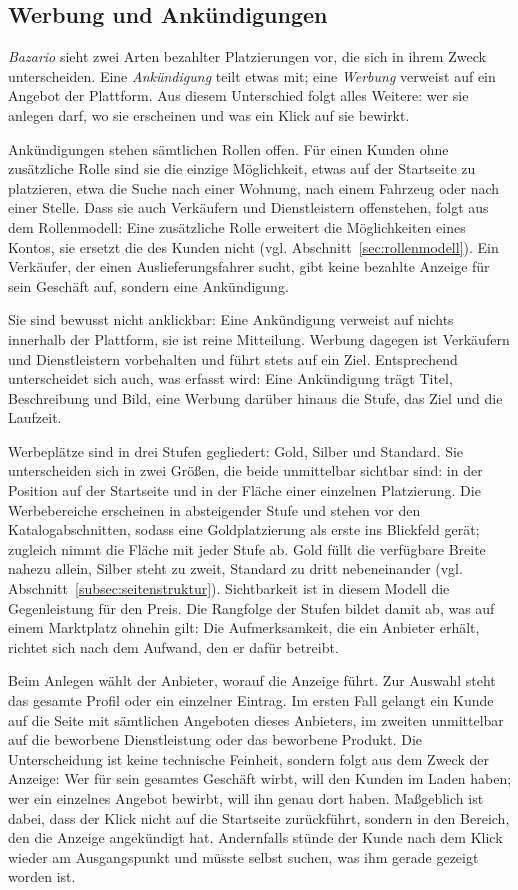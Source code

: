 \subsection{Werbung und Ankündigungen}
\label{subsec:werbung_konzept}

\textit{Bazario} sieht zwei Arten bezahlter Platzierungen vor, die
sich in ihrem Zweck unterscheiden. Eine \emph{Ankündigung} teilt
etwas mit; eine \emph{Werbung} verweist auf ein Angebot der
Plattform. Aus diesem Unterschied folgt alles Weitere: wer sie
anlegen darf, wo sie erscheinen und was ein Klick auf sie bewirkt.

Ankündigungen stehen sämtlichen Rollen offen. Für einen Kunden ohne
zusätzliche Rolle sind sie die einzige Möglichkeit, etwas auf der
Startseite zu platzieren, etwa die Suche nach einer Wohnung, nach
einem Fahrzeug oder nach einer Stelle. Dass sie auch Verkäufern und
Dienstleistern offenstehen, folgt aus dem Rollenmodell: Eine
zusätzliche Rolle erweitert die Möglichkeiten eines Kontos, sie
ersetzt die des Kunden nicht (vgl.
Abschnitt~\ref{sec:rollenmodell}). Ein Verkäufer, der einen
Auslieferungsfahrer sucht, gibt keine bezahlte Anzeige für sein
Geschäft auf, sondern eine Ankündigung.

Sie sind bewusst nicht anklickbar: Eine Ankündigung verweist auf
nichts innerhalb der Plattform, sie ist reine Mitteilung. Werbung
dagegen ist Verkäufern und Dienstleistern vorbehalten und führt stets
auf ein Ziel. Entsprechend unterscheidet sich auch, was erfasst wird:
Eine Ankündigung trägt Titel, Beschreibung und Bild, eine Werbung
darüber hinaus die Stufe, das Ziel und die Laufzeit.

Werbeplätze sind in drei Stufen gegliedert: Gold, Silber und
Standard. Sie unterscheiden sich in zwei Größen, die beide
unmittelbar sichtbar sind: in der Position auf der Startseite und in
der Fläche einer einzelnen Platzierung. Die Werbebereiche erscheinen
in absteigender Stufe und stehen vor den Katalogabschnitten, sodass
eine Goldplatzierung als erste ins Blickfeld gerät; zugleich nimmt
die Fläche mit jeder Stufe ab. Gold füllt die verfügbare Breite
nahezu allein, Silber steht zu zweit, Standard zu dritt nebeneinander
(vgl. Abschnitt~\ref{subsec:seitenstruktur}). Sichtbarkeit ist in
diesem Modell die Gegenleistung für den Preis. Die Rangfolge der
Stufen bildet damit ab, was auf einem Marktplatz ohnehin gilt: Die
Aufmerksamkeit, die ein Anbieter erhält, richtet sich nach dem
Aufwand, den er dafür betreibt.

Beim Anlegen wählt der Anbieter, worauf die Anzeige führt. Zur
Auswahl steht das gesamte Profil oder ein einzelner Eintrag. Im
ersten Fall gelangt ein Kunde auf die Seite mit sämtlichen Angeboten
dieses Anbieters, im zweiten unmittelbar auf die beworbene
Dienstleistung oder das beworbene Produkt. Die Unterscheidung ist
keine technische Feinheit, sondern folgt aus dem Zweck der Anzeige:
Wer für sein gesamtes Geschäft wirbt, will den Kunden im Laden haben;
wer ein einzelnes Angebot bewirbt, will ihn genau dort haben.
Maßgeblich ist dabei, dass der Klick nicht auf die Startseite
zurückführt, sondern in den Bereich, den die Anzeige angekündigt hat.
Andernfalls stünde der Kunde nach dem Klick wieder am Ausgangspunkt
und müsste selbst suchen, was ihm gerade gezeigt worden ist.

